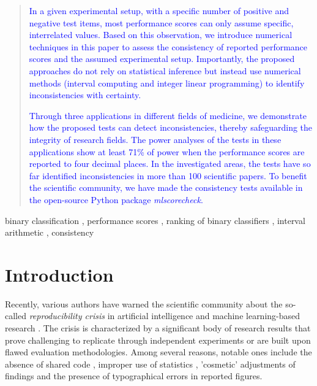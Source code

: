 \documentclass[3p, times]{elsarticle}
\begin{document}
\begin{frontmatter}
\begin{abstract}
\textcolor{blue}{
In a given experimental setup, with a specific number of positive and negative test items, most performance scores can only assume specific, interrelated values. 
Based on this observation, we introduce numerical techniques in this paper to assess the consistency of reported performance scores and the assumed experimental setup. Importantly, the proposed approaches do not rely on statistical inference but instead use numerical methods (interval computing and integer linear programming) to identify inconsistencies with certainty.} 

\textcolor{blue}{
Through three applications in different fields of medicine, we demonstrate how the proposed tests can detect inconsistencies, thereby safeguarding the integrity of research fields. The power analyses of the tests in these applications show at least 71\% of power when the performance scores are reported to four decimal places. In the investigated areas, the tests have so far identified inconsistencies in more than 100 scientific papers. To benefit the scientific community, we have made the consistency tests available in the open-source Python package \emph{mlscorecheck}.}

\end{abstract}

\begin{keyword}
binary classification
\sep 
performance scores
\sep
ranking of binary classifiers
\sep 
interval arithmetic
\sep
consistency
\end{keyword}


\end{frontmatter}
        


\thispagestyle{empty}

\section{Introduction}\label{section:Introduction}

Recently, various authors have warned the scientific community about the so-called \emph{reproducibility crisis} in artificial intelligence and machine learning-based research \cite{leakage, reprcrisis, repr0, repr1}. The crisis is characterized by a significant body of research results that prove challenging to replicate through independent experiments or are built upon flawed evaluation methodologies. Among several reasons, notable ones include the absence of shared code \cite{leakage}, improper use of statistics \cite{leakage, staterrors}, 'cosmetic' adjustments of findings \cite{fabrication} and the presence of typographical errors in reported figures.
\end{document}
